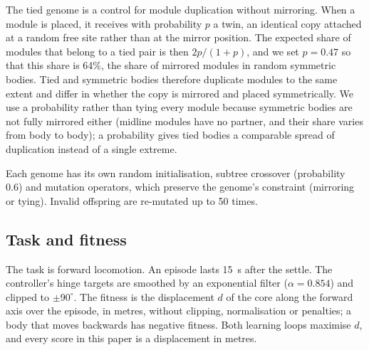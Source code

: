 The tied genome is a control for module duplication without mirroring. When a module is placed, it receives with probability $p$ a twin, an identical copy attached at a random free site rather than at the mirror position. The expected share of modules that belong to a tied pair is then $2p/(1+p)$, and we set $p = 0.47$ so that this share is 64\%, the share of mirrored modules in random symmetric bodies. Tied and symmetric bodies therefore duplicate modules to the same extent and differ in whether the copy is mirrored and placed symmetrically. We use a probability rather than tying every module because symmetric bodies are not fully mirrored either (midline modules have no partner, and their share varies from body to body); a probability gives tied bodies a comparable spread of duplication instead of a single extreme.

Each genome has its own random initialisation, subtree crossover (probability 0.6) and mutation operators, which preserve the genome's constraint (mirroring or tying). Invalid offspring are re-mutated up to 50 times.

\subsection{Task and fitness}
\label{sec:task}

The task is forward locomotion. An episode lasts \SI{15}{s} after the settle. The controller's hinge targets are smoothed by an exponential filter ($\alpha = 0.854$) and clipped to $\pm 90^\circ$. The fitness is the displacement $d$ of the core along the forward axis over the episode, in metres, without clipping, normalisation or penalties; a body that moves backwards has negative fitness. Both learning loops maximise $d$, and every score in this paper is a displacement in metres.

